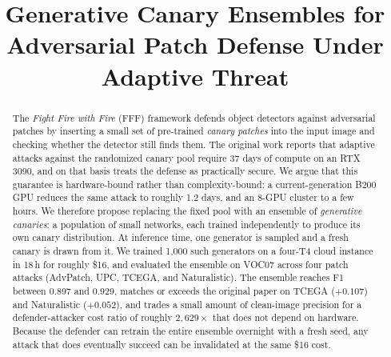 \documentclass[conference]{IEEEtran}
\begin{document}
\title{Generative Canary Ensembles for Adversarial Patch Defense Under Adaptive Threat}

\author{
}

\maketitle

\begin{abstract}
The \emph{Fight Fire with Fire} (FFF) framework defends object detectors
against adversarial patches by inserting a small set of pre-trained
\emph{canary patches} into the input image and checking whether the detector
still finds them. The original work reports that adaptive attacks against the
randomized canary pool require 37 days of compute on an RTX 3090, and on that
basis treats the defense as practically secure. We argue that this guarantee
is hardware-bound rather than complexity-bound: a current-generation B200 GPU
reduces the same attack to roughly 1.2 days, and an 8-GPU cluster to a few
hours. We therefore propose replacing the fixed pool with an ensemble of
\emph{generative canaries}: a population of small networks, each trained
independently to produce its own canary distribution. At inference time, one
generator is sampled and a fresh canary is drawn from it. We trained 1{,}000
such generators on a four-T4 cloud instance in 18\,h for roughly \$16, and
evaluated the ensemble on VOC07 across four patch attacks (AdvPatch, UPC,
TCEGA, and Naturalistic). The ensemble reaches F1 between 0.897 and 0.929,
matches or exceeds the original paper on TCEGA ($+0.107$) and Naturalistic
($+0.052$), and trades a small amount of clean-image precision for a
defender-attacker cost ratio of roughly $2{,}629\times$ that does not depend
on hardware. Because the defender can retrain the entire ensemble overnight
with a fresh seed, any attack that does eventually succeed can be invalidated
at the same \$16 cost.
\end{abstract}
\end{document}
